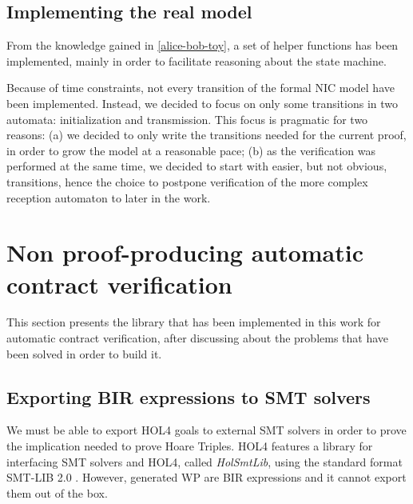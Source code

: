 \documentclass[10pt,a4paper]{article}
\begin{document}
\begin{multicols}{2}
\subsection{Implementing the real model} \label{impl-real-model}

From the knowledge gained in \ref{alice-bob-toy}, a set of helper functions has been implemented, mainly in order to facilitate reasoning about the state machine.

Because of time constraints, not every transition of the formal NIC model have been implemented. Instead, we decided to focus on only some transitions in two automata: initialization and transmission. This focus is pragmatic for two reasons: (a) we decided to only write the transitions needed for the current proof, in order to grow the model at a reasonable pace; (b) as the verification was performed at the same time, we decided to start with easier, but not obvious, transitions, hence the choice to postpone verification of the more complex reception automaton to later in the work.


\section{Non proof-producing automatic contract verification} \label{impl-non-pp-wp-lib}

This section presents the library that has been implemented in this work for automatic contract verification, after discussing about the problems that have been solved in order to build it.

\subsection{Exporting BIR expressions to SMT solvers} \label{exporting-bir-to-smt}

We must be able to export HOL4 goals to external SMT solvers in order to prove the implication needed to prove Hoare Triples. HOL4 features a library for interfacing {SMT} solvers and HOL4, called \textit{HolSmtLib}, using the standard format SMT-LIB 2.0 \cite{barrett_satisfiability_2016}. However, generated WP are BIR expressions and it cannot export them out of the box.


\end{multicols}
\end{document}
